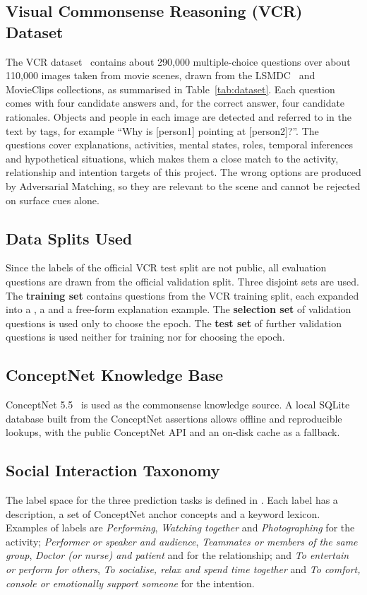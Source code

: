 \subsection{Visual Commonsense Reasoning (VCR) Dataset}
The VCR dataset~\cite{zellers2019vcr} contains about 290,000 multiple-choice questions over about 110,000 images taken from movie scenes, drawn from the LSMDC~\cite{rohrbach2017lsmdc} and MovieClips collections, as summarised in Table~\ref{tab:dataset}. Each question comes with four candidate answers and, for the correct answer, four candidate rationales. Objects and people in each image are detected and referred to in the text by tags, for example ``Why is [person1] pointing at [person2]?''. The questions cover explanations, activities, mental states, roles, temporal inferences and hypothetical situations, which makes them a close match to the activity, relationship and intention targets of this project. The wrong options are produced by Adversarial Matching, so they are relevant to the scene and cannot be rejected on surface cues alone.

\subsection{Data Splits Used}
Since the labels of the official VCR test split are not public, all evaluation questions are drawn from the official validation split. Three disjoint sets are used. The \textbf{training set} contains questions from the VCR training split, each expanded into a \QtoA, a \QAtoR{} and a free-form explanation example. The \textbf{selection set} of validation questions is used only to choose the epoch. The \textbf{test set} of further validation questions is used neither for training nor for choosing the epoch.

\subsection{ConceptNet Knowledge Base}
ConceptNet 5.5~\cite{speer2017conceptnet} is used as the commonsense knowledge source. A local SQLite database built from the ConceptNet assertions allows offline and reproducible lookups, with the public ConceptNet API and an on-disk cache as a fallback.

\subsection{Social Interaction Taxonomy}
The label space for the three prediction tasks is defined in . Each label has a description, a set of ConceptNet anchor concepts and a keyword lexicon. Examples of labels are \emph{Performing}, \emph{Watching together} and \emph{Photographing} for the activity; \emph{Performer or speaker and audience}, \emph{Teammates or members of the same group}, \emph{Doctor (or nurse) and patient} and  for the relationship; and \emph{To entertain or perform for others}, \emph{To socialise, relax and spend time together} and \emph{To comfort, console or emotionally support someone} for the intention.
